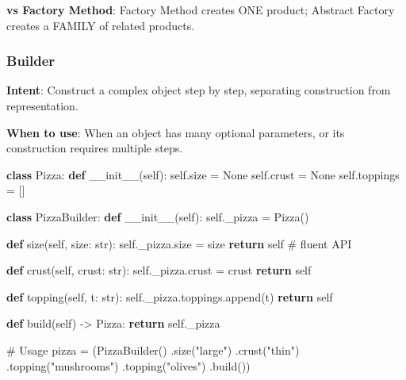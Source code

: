 \documentclass[11pt]{article}
\newenvironment{Shaded}{\begin{snugshade}}{\end{snugshade}}
\newcommand{\BuiltInTok}[1]{\textcolor[rgb]{0.50,0.55,0.55}{#1}}
\newcommand{\CommentTok}[1]{\textcolor[rgb]{0.48,0.49,0.49}{#1}}
\newcommand{\ControlFlowTok}[1]{\textcolor[rgb]{0.99,0.74,0.29}{\textbf{#1}}}
\newcommand{\FunctionTok}[1]{\textcolor[rgb]{0.56,0.27,0.68}{#1}}
\newcommand{\KeywordTok}[1]{\textcolor[rgb]{0.81,0.81,0.76}{\textbf{#1}}}
\newcommand{\NormalTok}[1]{\textcolor[rgb]{0.81,0.81,0.76}{#1}}
\newcommand{\OperatorTok}[1]{\textcolor[rgb]{0.81,0.81,0.76}{#1}}
\newcommand{\StringTok}[1]{\textcolor[rgb]{0.96,0.31,0.31}{#1}}
\newcommand{\VariableTok}[1]{\textcolor[rgb]{0.15,0.68,0.68}{#1}}
\begin{document}
\textbf{vs Factory Method}: Factory Method creates ONE product; Abstract Factory creates a FAMILY of related products.

\subsubsection{Builder}\label{builder}

\textbf{Intent}: Construct a complex object step by step, separating construction from representation.

\textbf{When to use}: When an object has many optional parameters, or its construction requires multiple steps.


\begin{Shaded}
\begin{Highlighting}[]
\KeywordTok{class}\NormalTok{ Pizza:}
    \KeywordTok{def} \FunctionTok{\_\_init\_\_}\NormalTok{(}\VariableTok{self}\NormalTok{):}
        \VariableTok{self}\NormalTok{.size }\OperatorTok{=} \VariableTok{None}
        \VariableTok{self}\NormalTok{.crust }\OperatorTok{=} \VariableTok{None}
        \VariableTok{self}\NormalTok{.toppings }\OperatorTok{=}\NormalTok{ []}

\KeywordTok{class}\NormalTok{ PizzaBuilder:}
    \KeywordTok{def} \FunctionTok{\_\_init\_\_}\NormalTok{(}\VariableTok{self}\NormalTok{):}
        \VariableTok{self}\NormalTok{.\_pizza }\OperatorTok{=}\NormalTok{ Pizza()}

    \KeywordTok{def}\NormalTok{ size(}\VariableTok{self}\NormalTok{, size: }\BuiltInTok{str}\NormalTok{):}
        \VariableTok{self}\NormalTok{.\_pizza.size }\OperatorTok{=}\NormalTok{ size}
        \ControlFlowTok{return} \VariableTok{self}           \CommentTok{\# fluent API}

    \KeywordTok{def}\NormalTok{ crust(}\VariableTok{self}\NormalTok{, crust: }\BuiltInTok{str}\NormalTok{):}
        \VariableTok{self}\NormalTok{.\_pizza.crust }\OperatorTok{=}\NormalTok{ crust}
        \ControlFlowTok{return} \VariableTok{self}

    \KeywordTok{def}\NormalTok{ topping(}\VariableTok{self}\NormalTok{, t: }\BuiltInTok{str}\NormalTok{):}
        \VariableTok{self}\NormalTok{.\_pizza.toppings.append(t)}
        \ControlFlowTok{return} \VariableTok{self}

    \KeywordTok{def}\NormalTok{ build(}\VariableTok{self}\NormalTok{) }\OperatorTok{{-}\textgreater{}}\NormalTok{ Pizza:}
        \ControlFlowTok{return} \VariableTok{self}\NormalTok{.\_pizza}

\CommentTok{\# Usage}
\NormalTok{pizza }\OperatorTok{=}\NormalTok{ (PizzaBuilder()}
\NormalTok{         .size(}\StringTok{"large"}\NormalTok{)}
\NormalTok{         .crust(}\StringTok{"thin"}\NormalTok{)}
\NormalTok{         .topping(}\StringTok{"mushrooms"}\NormalTok{)}
\NormalTok{         .topping(}\StringTok{"olives"}\NormalTok{)}
\NormalTok{         .build())}
\end{Highlighting}
\end{Shaded}
\end{document}
